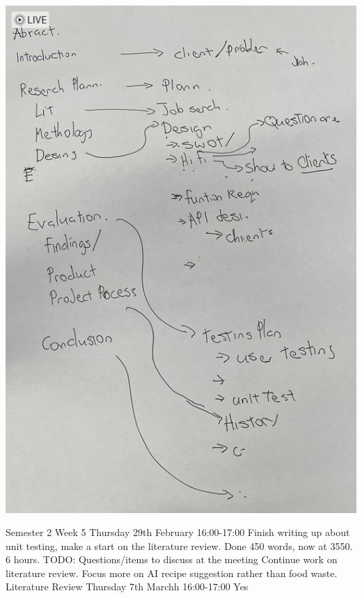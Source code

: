 \documentclass[../CHEFCookingHelper.tex]{subfiles}
\begin{document}
\includegraphics[angle=90,width=\textwidth]{appendicies/report_structure.png}

\logbookentry
{Semester 2 Week 5}
{Thursday 29th February 16:00-17:00}
{Finish writing up about unit testing, make a start on the literature review.
Done 450 words, now at 3550.}
{6 hours.}
{TODO: Questions/items to discuss at the meeting}
{Continue work on literature review. Focus more on AI recipe suggestion rather than
food waste.}
{Literature Review}
{Thursday 7th Marchh 16:00-17:00}
{Yes}
\end{document}
